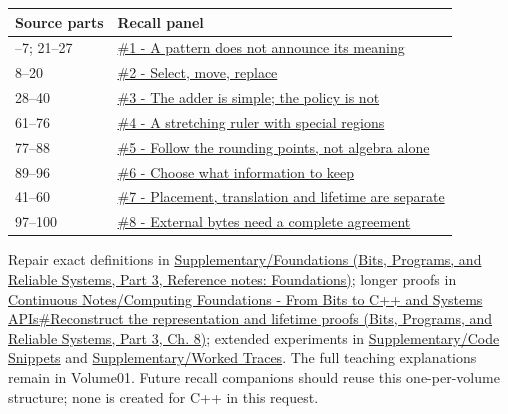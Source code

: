 {\def\LTcaptype{none} %
\begin{longtable}[]{@{}ll@{}}
\toprule\noalign{}
Source parts & Recall panel \\
\midrule\noalign{}
\endhead
\bottomrule\noalign{}
\endlastfoot
1--7; 21--27 & \hyperref[appendix-ef4d27797a92-a-pattern-does-not-announce-its-meaning]{\#1 - A pattern does not announce its meaning} \\
8--20 & \hyperref[appendix-ef4d27797a92-select-move-replace]{\#2 - Select, move, replace} \\
28--40 & \hyperref[appendix-ef4d27797a92-the-adder-is-simple-the-policy-is-not]{\#3 - The adder is simple; the policy is not} \\
61--76 & \hyperref[appendix-ef4d27797a92-a-stretching-ruler-with-special-regions]{\#4 - A stretching ruler with special regions} \\
77--88 & \hyperref[appendix-ef4d27797a92-follow-the-rounding-points-not-algebra-alone]{\#5 - Follow the rounding points, not algebra alone} \\
89--96 & \hyperref[appendix-ef4d27797a92-choose-what-information-to-keep]{\#6 - Choose what information to keep} \\
41--60 & \hyperref[appendix-ef4d27797a92-placement-translation-and-lifetime-are-separate]{\#7 - Placement, translation and lifetime are separate} \\
97--100 & \hyperref[appendix-ef4d27797a92-external-bytes-need-a-complete-agreement]{\#8 - External bytes need a complete agreement} \\
\end{longtable}
}

Repair exact definitions in \href{../01-Bits-Programs-and-Reliable-Systems-P03/main.pdf\#nameddest=appendix-fd090d982a15}{Supplementary/Foundations (Bits, Programs, and Reliable Systems, Part 3, Reference notes: Foundations)}; longer proofs in \href{../01-Bits-Programs-and-Reliable-Systems-P03/main.pdf\#nameddest=01-foundations-i-ch010-reconstruct-the-representation-and-lifetime-proofs}{Continuous Notes/Computing Foundations - From Bits to C++ and Systems APIs\#Reconstruct the representation and lifetime proofs (Bits, Programs, and Reliable Systems, Part 3, Ch. 8)}; extended experiments in \hyperref[appendix-4e2236f53445]{Supplementary/Code Snippets} and \hyperref[appendix-92ff77d4dfdc]{Supplementary/Worked Traces}. The full teaching explanations remain in Volume01. Future recall companions should reuse this one-per-volume structure; none is created for C++ in this request.

